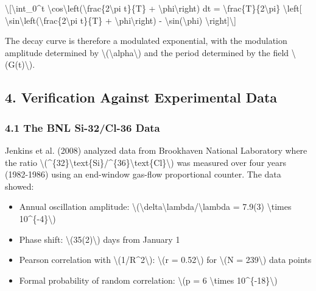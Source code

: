 \documentclass[
  10pt,
]{article}
\providecommand{\tightlist}{%
  \setlength{\itemsep}{0pt}\setlength{\parskip}{0pt}}
\begin{document}
\textbackslash{[}\textbackslash int\_0\^{}t
\textbackslash cos\textbackslash left(\textbackslash frac\{2\textbackslash pi
t\textquotesingle\}\{T\} + \textbackslash phi\textbackslash right)
dt\textquotesingle{} = \textbackslash frac\{T\}\{2\textbackslash pi\}
\textbackslash left{[}
\textbackslash sin\textbackslash left(\textbackslash frac\{2\textbackslash pi
t\}\{T\} + \textbackslash phi\textbackslash right) -
\textbackslash sin(\textbackslash phi)
\textbackslash right{]}\textbackslash{]}

The decay curve is therefore a modulated exponential, with the
modulation amplitude determined by
\textbackslash(\textbackslash alpha\textbackslash) and the period
determined by the field \textbackslash(G(t)\textbackslash).

\hypertarget{verification-against-experimental-data}{%
\subsection{4. Verification Against Experimental
Data}\label{verification-against-experimental-data}}

\hypertarget{the-bnl-si-32cl-36-data}{%
\subsubsection{4.1 The BNL Si-32/Cl-36
Data}\label{the-bnl-si-32cl-36-data}}

Jenkins et al. (2008) analyzed data from Brookhaven National Laboratory
where the ratio
\textbackslash(\^{}\{32\}\textbackslash text\{Si\}/\^{}\{36\}\textbackslash text\{Cl\}\textbackslash)
was measured over four years (1982-1986) using an end-window gas-flow
proportional counter. The data showed:

\begin{itemize}
\tightlist
\item
  Annual oscillation amplitude:
  \textbackslash(\textbackslash delta\textbackslash lambda/\textbackslash lambda
  = 7.9(3) \textbackslash times 10\^{}\{-4\}\textbackslash)
\item
  Phase shift: \textbackslash(35(2)\textbackslash) days from January 1
\item
  Pearson correlation with \textbackslash(1/R\^{}2\textbackslash):
  \textbackslash(r = 0.52\textbackslash) for \textbackslash(N =
  239\textbackslash) data points
\item
  Formal probability of random correlation: \textbackslash(p = 6
  \textbackslash times 10\^{}\{-18\}\textbackslash)
\end{itemize}
\end{document}
